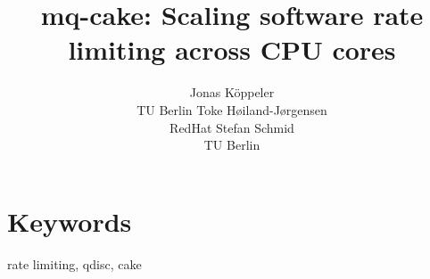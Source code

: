 \documentclass[letterpaper]{article}
\title{mq-cake: Scaling software rate limiting across CPU cores}
\author{Jonas Köppeler\\TU Berlin \And Toke H\o{}iland-J\o{}rgensen\\RedHat \And Stefan Schmid \\ TU Berlin
}
\begin{document}
\maketitle

\section{Keywords}
rate limiting, qdisc, cake








\end{document}

